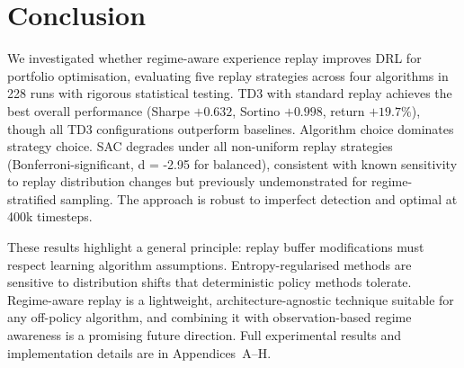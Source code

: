 \documentclass[11pt,a4paper]{article}
\begin{document}
\section{Conclusion}
\label{sec:conclusion}

We investigated whether regime-aware experience replay improves DRL for portfolio optimisation, evaluating five replay strategies across four algorithms in 228 runs with rigorous statistical testing. TD3 with standard replay achieves the best overall performance (Sharpe $+0.632$, Sortino $+0.998$, return $+19.7\%$), though all TD3 configurations outperform baselines. Algorithm choice dominates strategy choice. SAC degrades under all non-uniform replay strategies (Bonferroni-significant, d = -2.95 for balanced), consistent with known sensitivity to replay distribution changes but previously undemonstrated for regime-stratified sampling. The approach is robust to imperfect detection and optimal at 400k timesteps.

These results highlight a general principle: replay buffer modifications must respect learning algorithm assumptions. Entropy-regularised methods are sensitive to distribution shifts that deterministic policy methods tolerate. Regime-aware replay is a lightweight, architecture-agnostic technique suitable for any off-policy algorithm, and combining it with observation-based regime awareness \citep{nixon2025regime} is a promising future direction. Full experimental results and implementation details are in Appendices~A--H.

\setlength{\bibsep}{0.25pt}
{\footnotesize


}
\end{document}
